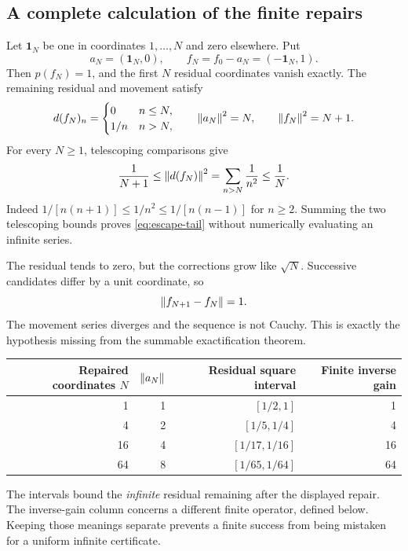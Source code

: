 \subsection{A complete calculation of the finite repairs}
Let \(\mathbf 1_N\) be one in coordinates \(1,\ldots,N\) and zero elsewhere. Put
\[
 a_N=(\mathbf 1_N,0),\qquad f_N=f_0-a_N=(-\mathbf 1_N,1).
\]
Then \(p(f_N)=1\), and the first \(N\) residual coordinates vanish exactly. The remaining residual and movement satisfy
\[
 d(f_N)_n=\begin{cases}0&n\le N,\\1/n&n>N,\end{cases}
 \qquad \left\lVert a_N\right\rVert^2=N,\qquad \left\lVert f_N\right\rVert^2=N+1.
\]
For every \(N\ge1\), telescoping comparisons give
\begin{equation}\label{eq:escape-tail}
 \frac1{N+1}\le\left\lVert d(f_N)\right\rVert^2
 =\sum_{n>N}\frac1{n^2}\le\frac1N.
\end{equation}
Indeed \(1/[n(n+1)]\le1/n^2\le1/[n(n-1)]\) for \(n\ge2\). Summing the two telescoping bounds proves \eqref{eq:escape-tail} without numerically evaluating an infinite series.

The residual tends to zero, but the corrections grow like \(\sqrt N\). Successive candidates differ by a unit coordinate, so
\[
 \left\lVert f_{N+1}-f_N\right\rVert=1.
\]
The movement series diverges and the sequence is not Cauchy. This is exactly the hypothesis missing from the summable exactification theorem.

\begin{center}
\begin{tabular}{@{}rrrr@{}}
\toprule Repaired coordinates \(N\) & \(\left\lVert a_N\right\rVert\) & Residual square interval & Finite inverse gain\\\midrule
1 & 1 & \([1/2,1]\) & 1\\
4 & 2 & \([1/5,1/4]\) & 4\\
16 & 4 & \([1/17,1/16]\) & 16\\
64 & 8 & \([1/65,1/64]\) & 64\\\bottomrule
\end{tabular}
\end{center}
The intervals bound the \emph{infinite} residual remaining after the displayed repair. The inverse-gain column concerns a different finite operator, defined below. Keeping those meanings separate prevents a finite success from being mistaken for a uniform infinite certificate.


